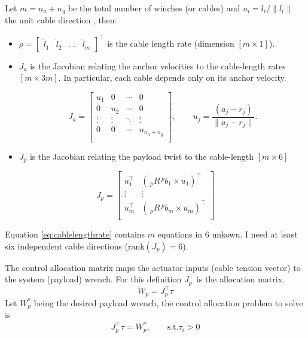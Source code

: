 Let $m = n_a + n_g$ be the total number of winches (or cables) and $u_i = l_i/\|l_i\|$ the unit cable direction , then:
\begin{itemize}
    \item $\dot{\rho} = \begin{bmatrix}
        \dot{l}_1 & \dot{l}_2 & \dots & \dot{l}_m
    \end{bmatrix}^\top$ is the cable length rate (dimension $[m\times1]$). 

    \item $J_a$ is the Jacobian relating the anchor velocities to the cable-length rates $[m\times3m]$. In particular, each cable depends only on its anchor velocity.
    
\begin{equation}
J_a =
\begin{bmatrix}
u_1 & 0   & \cdots & 0 \\
0   & u_2 & \cdots & 0 \\
\vdots & \vdots & \ddots & \vdots \\
0 & 0 & \cdots & u_{n_a + n_g} \\
\end{bmatrix},
\qquad
u_j = \frac{(a_j - r_j)}{\|a_j - r_j\|}.
\label{eq:cableVector}
\end{equation}
    \item $J_p$ is the Jacobian relating the payload twist to the cable-length  $[m\times6]$
\end{itemize}
\begin{equation}
    J_p =
\begin{bmatrix}
u_1^\top & \left( \, _pR\, ^pb_1 \times u_1 \right)^\top \\ 
\vdots & \vdots \\
u_m^\top & \left( \, _pR\, ^pb_m \times u_m \right)^\top \\
\end{bmatrix}
\label{eq:jp}
\end{equation}
\begin{note}
    Equation \ref{eq:cablelengthrate} contains $m$ equations in 6 unkown. I need at least six independent cable directions ($\text{rank}(J_p) = 6$).
\end{note}

\noindent The control allocation matrix maps the actuator inputs (cable tension vector) to the system (payload) wrench. For this definition $J_p^\top$ is the allocation matrix.
\begin{equation}
    W_p = J_p^\top \tau
\end{equation}
Let $W_p^*$ being the desired payload wrench, the control allocation problem to solve is
\begin{equation}
    J_p^\top \tau = W_p^*, \qquad \text{s.t}. \tau_i > 0
\end{equation}

